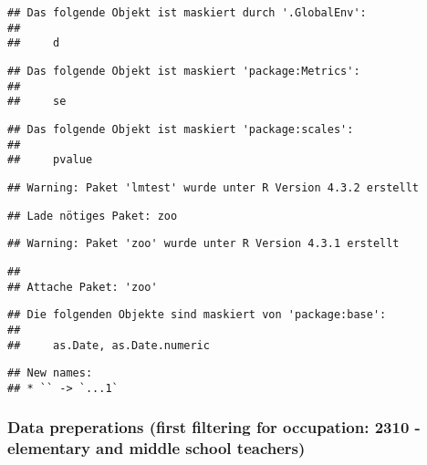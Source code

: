 \documentclass[
]{article}
\begin{document}
\begin{verbatim}
## Das folgende Objekt ist maskiert durch '.GlobalEnv':
## 
##     d
\end{verbatim}

\begin{verbatim}
## Das folgende Objekt ist maskiert 'package:Metrics':
## 
##     se
\end{verbatim}

\begin{verbatim}
## Das folgende Objekt ist maskiert 'package:scales':
## 
##     pvalue
\end{verbatim}

\begin{verbatim}
## Warning: Paket 'lmtest' wurde unter R Version 4.3.2 erstellt
\end{verbatim}

\begin{verbatim}
## Lade nötiges Paket: zoo
\end{verbatim}

\begin{verbatim}
## Warning: Paket 'zoo' wurde unter R Version 4.3.1 erstellt
\end{verbatim}

\begin{verbatim}
## 
## Attache Paket: 'zoo'
\end{verbatim}

\begin{verbatim}
## Die folgenden Objekte sind maskiert von 'package:base':
## 
##     as.Date, as.Date.numeric
\end{verbatim}

\begin{verbatim}
## New names:
## * `` -> `...1`
\end{verbatim}

\hypertarget{data-preperations-first-filtering-for-occupation-2310---elementary-and-middle-school-teachers}{%
\subsubsection{Data preperations (first filtering for occupation: 2310 -
elementary and middle school
teachers)}\label{data-preperations-first-filtering-for-occupation-2310---elementary-and-middle-school-teachers}}
\end{document}
